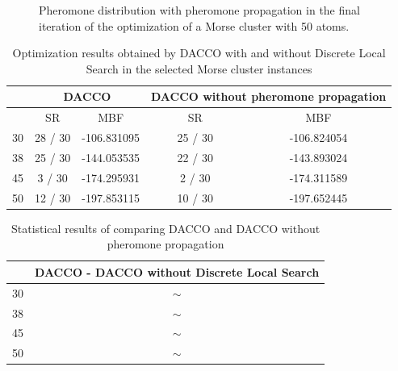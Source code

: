 \begin{figure}[ht]
\begin{minipage}[b]{0.5\linewidth}
		\caption{Pheromone distribution with pheromone propagation in the final iteration of the optimization of a Morse cluster with 50 atoms.}
		\label{fig:propagation_graph}
		\end{minipage}
		\end{figure}
		
		\begin{table}[!htdp]
				\begin{center}
					\begin{tabular}{| c | c | c | c | c |}
						\hline
						~ & \multicolumn{2}{c|}{\textbf{DACCO}} & \multicolumn{2}{p{4cm}|}{\textbf{DACCO without pheromone propagation}} \\ \hline
						~ & SR & MBF & SR & MBF \\ \hline
						30 & 28 / 30 & -106.831095 & 25 / 30 & -106.824054 \\ \hline
						38 & 25 / 30 & -144.053535 & 22 / 30 & -143.893024 \\ \hline
						45 & 3 / 30 & -174.295931 & 2 / 30 & -174.311589 \\ \hline
						50 & 12 / 30 & -197.853115 & 10 / 30 & -197.652445 \\ \hline
					\end{tabular}
					\caption{Optimization results obtained by DACCO with and without Discrete Local Search in the selected Morse cluster instances}
					\label{tab:pheromone_propagation_results}
				\end{center}
		\end{table}
		\begin{table}[!htdp]
				\begin{center}
					\begin{tabular}{| c | c |}
						\hline
						~ & \multicolumn{1}{p{4cm}|}{\textbf{DACCO - DACCO without Discrete Local Search}} \\ \hline
						30 & $\sim$ \\ \hline
						38 & $\sim$ \\ \hline
						45 & $\sim$ \\ \hline
						50 & $\sim$ \\ \hline
					\end{tabular}
					\caption{Statistical results of comparing DACCO and DACCO without pheromone propagation}
					\label{tab:statistical_comparison_pheromone_propagation}
				\end{center}
		\end{table}
		
		
	